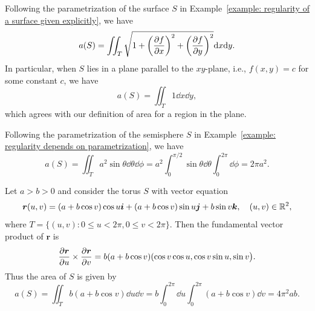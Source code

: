 \begin{exampleenv}
    Following the parametrization of the surface $S$ in Example~\ref{example: regularity of a surface given explicitly}, we have
    $$
    a(S) = \iint_T \sqrt{1 + \left( \pdv{f}{x} \right)^2 + \left( \pdv{f}{y} \right)^2} \dd x \dd y.
    $$
    In particular, when $S$ lies in a plane parallel to the $xy$-plane, i.e., $f(x,y) = c$ for some constant $c$, we have
    $$ a(S) = \iint_T 1 \dd x \dd y, $$
    which agrees with our definition of area for a region in the plane.
\end{exampleenv}
\begin{exampleenv}
    Following the parametrization of the semisphere $S$ in Example~\ref{example: regularity depends on parametrization}, we have
    $$ a(S) = \iint_T a^2\sin\theta \dd \theta \dd \phi = a^2 \int_0^{\pi/2} \sin\theta \dd \theta \int_0^{2\pi} \dd \phi = 2\pi a^2. $$
\end{exampleenv}
\begin{exampleenv}
    Let $a>b>0$ and consider the torus $S$ with vector equation
    $$ \bm r(u,v) = (a + b\cos v)\cos u\bm i + (a + b\cos v)\sin u\bm j + b\sin v\bm k,\quad (u,v)\in \mathbb{R}^2,$$
    where $T = \{(u,v): 0\le u < 2\pi, 0\le v < 2\pi\}$. Then the fundamental vector product of $\bm r$ is
    $$ \pdv{\bm r}{u}\times \pdv{\bm r}{v} = b(a + b\cos v)(\cos v\cos u,\cos v\sin u, \sin v\big).$$
    Thus the area of $S$ is given by
    $$ a(S) = \iint_T b(a + b\cos v) \dd u \dd v = b \int_0^{2\pi} \dd u \int_0^{2\pi} (a + b\cos v) \dd v = 4\pi^2 ab. $$
\end{exampleenv}

